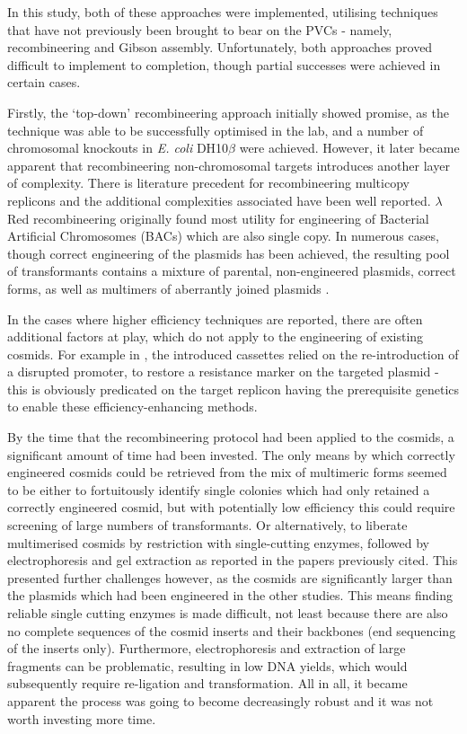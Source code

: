 In this study, both of these approaches were implemented, utilising techniques that have not previously been brought to bear on the PVCs - namely, recombineering and Gibson assembly. Unfortunately, both approaches proved difficult to implement to completion, though partial successes were achieved in certain cases.

Firstly, the `top-down' recombineering approach initially showed promise, as the technique was able to be successfully optimised in the lab, and a number of chromosomal knockouts in \emph{E. coli} DH10$\beta$ were achieved. However, it later became apparent that recombineering non-chromosomal targets introduces another layer of complexity. There is literature precedent for recombineering multicopy replicons and the additional complexities associated have been well reported. $\lambda$Red recombineering originally found most utility for engineering of Bacterial Artificial Chromosomes (BACs) which are also single copy. In numerous cases, though correct engineering of the plasmids has been achieved, the resulting pool of transformants contains a mixture of parental, non-engineered plasmids, correct forms, as well as multimers of aberrantly joined plasmids \citep{Thomason2007, Lee2001a, Yosef2004, Vetcher2005}.

In the cases where higher efficiency techniques are reported, there are often additional factors at play, which do not apply to the engineering of existing cosmids. For example in \cite{Yosef2004}, the introduced cassettes relied on the re-introduction of a disrupted promoter, to restore a resistance marker on the targeted plasmid - this is obviously predicated on the target replicon having the prerequisite genetics to enable these efficiency-enhancing methods.

By the time that the recombineering protocol had been applied to the cosmids, a significant amount of time had been invested. The only means by which correctly engineered cosmids could be retrieved from the mix of multimeric forms seemed to be either to fortuitously identify single colonies which had only retained a correctly engineered cosmid, but with potentially low efficiency this could require screening of large numbers of transformants. Or alternatively, to liberate multimerised cosmids by restriction with single-cutting enzymes, followed by electrophoresis and gel extraction as reported in the papers previously cited. This presented further challenges however, as the cosmids are significantly larger than the plasmids which had been engineered in the other studies. This means finding reliable single cutting enzymes is made difficult, not least because there are also no complete sequences of the cosmid inserts and their backbones (end sequencing of the inserts only). Furthermore, electrophoresis and extraction of large fragments can be problematic, resulting in low DNA yields, which would subsequently require re-ligation and transformation. All in all, it became apparent the process was going to become decreasingly robust and it was not worth investing more time.

